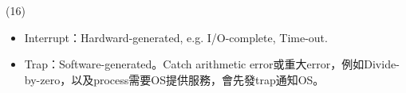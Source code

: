 \begin{theorem}{(16)} \quad\quad \begin{itemize}
        \item Interrupt：Hardward-generated, e.g. I/O-complete, Time-out.
        \item Trap：Software-generated。Catch arithmetic error或重大error，例如Divide-by-zero，以及process需要OS提供服務，會先發trap通知OS。
    \end{itemize}
\end{theorem}
